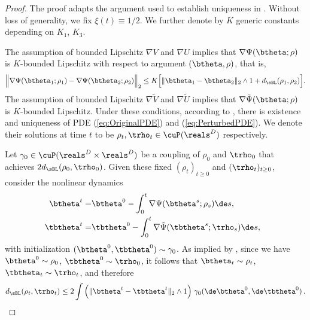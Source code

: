\documentclass[11pt]{article}
\begin{document}
\begin{proof}
The proof adapts the argument used to establish uniqueness in \cite{sznitman1991topics}. Without loss of generality, we fix $\xi(t) \equiv 1/2$. We further
denote by $K$ generic constants depending on $K_1$, $K_3$.

The assumption of bounded Lipschitz $\nabla V$ and $\nabla U$ implies that $\nabla \Psi(\btheta; \rho)$ is $K$-bounded Lipschitz with respect to argument $(\btheta, \rho)$, that is,
\begin{align}\label{eq:BoundedLipschitzInequality}
\Big\| \nabla \Psi(\btheta_1; \rho_1) - \nabla \Psi(\btheta_2; \rho_2) \Big\|_2 \le K \Big[\| \btheta_1 - \btheta_2 \|_2 \wedge 1 + d_{\sBL}(\rho_1, \rho_2)\Big].
\end{align}
The assumption of bounded Lipschitz $\nabla \tilde V$ and $\nabla \tilde U$ implies that $\nabla \tilde \Psi(\btheta; \rho)$ is $K$-bounded Lipschitz. Under these conditions, according to \cite[Theorem 1.1]{sznitman1991topics}, there is existence and uniqueness of PDE (\ref{eq:OriginalPDE}) and (\ref{eq:PerturbedPDE}). We denote their solutions at time $t$ to be $\rho_t, \trho_t \in \cuP(\reals^D)$ respectively. 

 Let $\gamma_0 \in \cuP(\reals^D \times \reals^D)$ be a coupling of $\rho_0$ and $\trho_0$ that achieves 
$2 d_{\sBL}(\rho_0, \trho_0)$.
Given these fixed $(\rho_t)_{t \ge 0}$ and $(\trho_t)_{t \ge 0}$, consider the nonlinear dynamics 
\begin{align} 
%
\btheta^t =& \btheta^0 - \int_0^t \nabla \Psi(\btheta^s;\rho_s) \de s , ~~\label{eqn:non_linear_in_perturbation_proof_1}\\
\tbtheta^t =& \tbtheta^0 - \int_0^t \nabla \tilde \Psi(\tbtheta^s;\trho_s) \de s,~~\label{eqn:non_linear_in_perturbation_proof_2}
%
\end{align}
%
with initialization $(\btheta^0,\tbtheta^0)\sim\gamma_0$.
As implied by \cite[Theorem 1.1]{sznitman1991topics}, since we have $\btheta^0 \sim \rho_0$, $\tbtheta^0 \sim \trho_0$, 
it follows that $\btheta_t\sim \rho_t$, $\tbtheta_t\sim \trho_t$, and therefore
%
\begin{equation}\label{eqn:BLBoundByDistance}
d_{\sBL}(\rho_t, \trho_t) \le 2 \int\Big( \| \btheta^t- \tbtheta^t \|_2  \wedge 1\Big)\; \gamma_0(\de \btheta^0, \de \tbtheta^0)\, .
\end{equation}


\end{proof}
\end{document}
